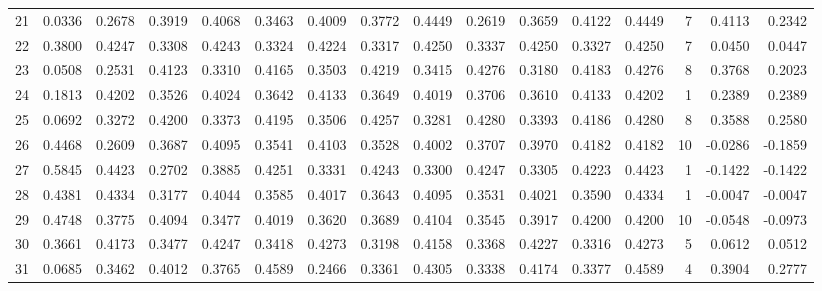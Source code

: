 \begin{tabular}{lrrrrrrrrrrrrrrr}
21  &      0.0336 &  0.2678 &  0.3919 &  0.4068 &  0.3463 &  0.4009 &  0.3772 &  0.4449 &  0.2619 &  0.3659 &   0.4122 &     0.4449 &      7 &                    0.4113 &                     0.2342 \\
22  &      0.3800 &  0.4247 &  0.3308 &  0.4243 &  0.3324 &  0.4224 &  0.3317 &  0.4250 &  0.3337 &  0.4250 &   0.3327 &     0.4250 &      7 &                    0.0450 &                     0.0447 \\
23  &      0.0508 &  0.2531 &  0.4123 &  0.3310 &  0.4165 &  0.3503 &  0.4219 &  0.3415 &  0.4276 &  0.3180 &   0.4183 &     0.4276 &      8 &                    0.3768 &                     0.2023 \\
24  &      0.1813 &  0.4202 &  0.3526 &  0.4024 &  0.3642 &  0.4133 &  0.3649 &  0.4019 &  0.3706 &  0.3610 &   0.4133 &     0.4202 &      1 &                    0.2389 &                     0.2389 \\
25  &      0.0692 &  0.3272 &  0.4200 &  0.3373 &  0.4195 &  0.3506 &  0.4257 &  0.3281 &  0.4280 &  0.3393 &   0.4186 &     0.4280 &      8 &                    0.3588 &                     0.2580 \\
26  &      0.4468 &  0.2609 &  0.3687 &  0.4095 &  0.3541 &  0.4103 &  0.3528 &  0.4002 &  0.3707 &  0.3970 &   0.4182 &     0.4182 &     10 &                   -0.0286 &                    -0.1859 \\
27  &      0.5845 &  0.4423 &  0.2702 &  0.3885 &  0.4251 &  0.3331 &  0.4243 &  0.3300 &  0.4247 &  0.3305 &   0.4223 &     0.4423 &      1 &                   -0.1422 &                    -0.1422 \\
28  &      0.4381 &  0.4334 &  0.3177 &  0.4044 &  0.3585 &  0.4017 &  0.3643 &  0.4095 &  0.3531 &  0.4021 &   0.3590 &     0.4334 &      1 &                   -0.0047 &                    -0.0047 \\
29  &      0.4748 &  0.3775 &  0.4094 &  0.3477 &  0.4019 &  0.3620 &  0.3689 &  0.4104 &  0.3545 &  0.3917 &   0.4200 &     0.4200 &     10 &                   -0.0548 &                    -0.0973 \\
30  &      0.3661 &  0.4173 &  0.3477 &  0.4247 &  0.3418 &  0.4273 &  0.3198 &  0.4158 &  0.3368 &  0.4227 &   0.3316 &     0.4273 &      5 &                    0.0612 &                     0.0512 \\
31  &      0.0685 &  0.3462 &  0.4012 &  0.3765 &  0.4589 &  0.2466 &  0.3361 &  0.4305 &  0.3338 &  0.4174 &   0.3377 &     0.4589 &      4 &                    0.3904 &                     0.2777 \\

\end{tabular}
